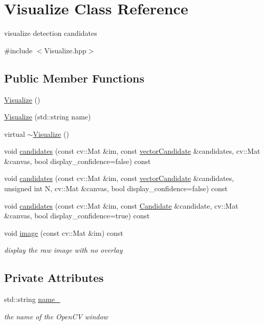 \hypertarget{classVisualize}{\section{Visualize Class Reference}
\label{classVisualize}
}


visualize detection candidates  




{\ttfamily \#include $<$Visualize.\-hpp$>$}

\subsection*{Public Member Functions}
\begin{DoxyCompactItemize}
\item 
\hyperlink{classVisualize_a8d4163ad53518ec0c8a3eaec2bf2fe7b}{Visualize} ()
\item 
\hyperlink{classVisualize_aa4934674b915dc27dd262c5b5a6970b0}{Visualize} (std\-::string name)
\item 
virtual \hyperlink{classVisualize_a50a487bde1d6e77a2b16a2abb28dd066}{$\sim$\-Visualize} ()
\item 
void \hyperlink{classVisualize_ada4023e56a4a59e9b8ecd6c1d8c4c99b}{candidates} (const cv\-::\-Mat \&im, const \hyperlink{types_8hpp_a04eefdf70d6c6b8effb5170271f1db05}{vector\-Candidate} \&candidates, cv\-::\-Mat \&canvas, bool display\-\_\-confidence=false) const 
\item 
void \hyperlink{classVisualize_a4dad0bd9e94aed0c454cf21027fdeb87}{candidates} (const cv\-::\-Mat \&im, const \hyperlink{types_8hpp_a04eefdf70d6c6b8effb5170271f1db05}{vector\-Candidate} \&candidates, unsigned int N, cv\-::\-Mat \&canvas, bool display\-\_\-confidence=false) const 
\item 
void \hyperlink{classVisualize_a49be21958241fe18358d999483d734e2}{candidates} (const cv\-::\-Mat \&im, const \hyperlink{classCandidate}{Candidate} \&candidate, cv\-::\-Mat \&canvas, bool display\-\_\-confidence=true) const 
\item 
void \hyperlink{classVisualize_a0464561197342e3a26d2f2bf317f3611}{image} (const cv\-::\-Mat \&im) const 
\begin{DoxyCompactList}\small\item\em display the raw image with no overlay \end{DoxyCompactList}\end{DoxyCompactItemize}
\subsection*{Private Attributes}
\begin{DoxyCompactItemize}
\item 
std\-::string \hyperlink{classVisualize_a1407427a175d3a6098df7c300c27bd0d}{name\-\_\-}
\begin{DoxyCompactList}\small\item\em the name of the Open\-C\-V window \end{DoxyCompactList}\end{DoxyCompactItemize}


